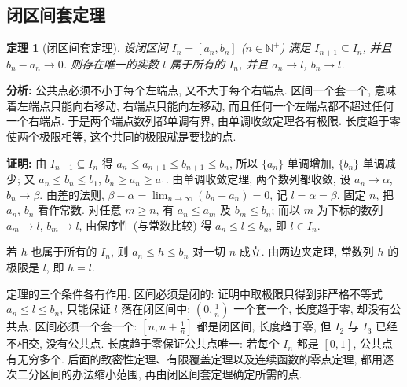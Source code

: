 \documentclass[UTF8,openany]{ctexbook}
\theoremstyle{chinesetextbook}
\newtheorem{theorem}{定理}[section]
\newenvironment{cnproof}{\par\indent\textbf{证明:} \ignorespaces}{\par}
\begin{document}
\subsection{闭区间套定理}
\begin{theorem}[闭区间套定理]
设闭区间 $I_n=[a_n,b_n]$ ($n\in\mathbb N^+$) 满足 $I_{n+1}\subseteq I_n$, 并且 $b_n-a_n\to0$. 则存在唯一的实数 $l$ 属于所有的 $I_n$, 并且 $a_n\to l$, $b_n\to l$.
\end{theorem}
\par\indent\textbf{分析:} 公共点必须不小于每个左端点, 又不大于每个右端点. 区间一个套一个, 意味着左端点只能向右移动, 右端点只能向左移动, 而且任何一个左端点都不超过任何一个右端点. 于是两个端点数列都单调有界, 由单调收敛定理各有极限. 长度趋于零使两个极限相等, 这个共同的极限就是要找的点.
\begin{cnproof}
由 $I_{n+1}\subseteq I_n$ 得 $a_n\le a_{n+1}\le b_{n+1}\le b_n$, 所以 $\{a_n\}$ 单调增加, $\{b_n\}$ 单调减少; 又 $a_n\le b_n\le b_1$, $b_n\ge a_n\ge a_1$. 由单调收敛定理, 两个数列都收敛, 设 $a_n\to\alpha$, $b_n\to\beta$. 由差的法则, $\displaystyle\beta-\alpha=\lim_{n\to\infty}(b_n-a_n)=0$, 记 $l=\alpha=\beta$. 固定 $n$, 把 $a_n$, $b_n$ 看作常数. 对任意 $m\ge n$, 有 $a_n\le a_m$ 及 $b_m\le b_n$; 而以 $m$ 为下标的数列 $a_m\to l$, $b_m\to l$, 由保序性 (与常数比较) 得 $a_n\le l\le b_n$, 即 $l\in I_n$.

若 $h$ 也属于所有的 $I_n$, 则 $a_n\le h\le b_n$ 对一切 $n$ 成立. 由两边夹定理, 常数列 $h$ 的极限是 $l$, 即 $h=l$.
\end{cnproof}
定理的三个条件各有作用. 区间必须是闭的: 证明中取极限只得到非严格不等式 $a_n\le l\le b_n$, 只能保证 $l$ 落在闭区间中; $\displaystyle\left(0,\frac1n\right)$ 一个套一个, 长度趋于零, 却没有公共点. 区间必须一个套一个: $\displaystyle\left[n,n+\frac1n\right]$ 都是闭区间, 长度趋于零, 但 $I_2$ 与 $I_3$ 已经不相交, 没有公共点. 长度趋于零保证公共点唯一: 若每个 $I_n$ 都是 $[0,1]$, 公共点有无穷多个. 后面的致密性定理、有限覆盖定理以及连续函数的零点定理, 都用逐次二分区间的办法缩小范围, 再由闭区间套定理确定所需的点.
\end{document}
